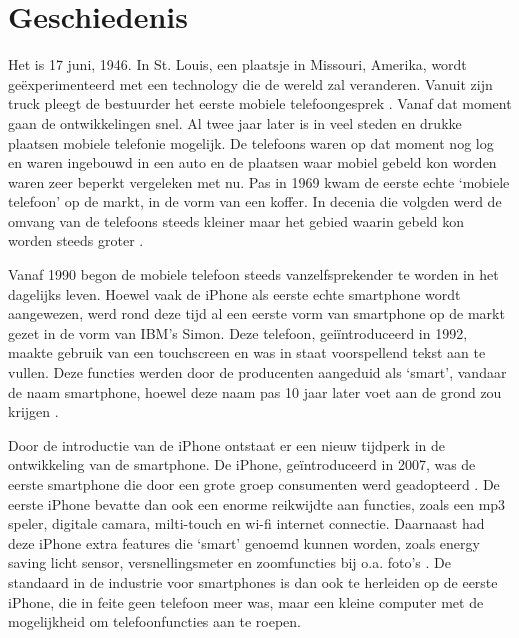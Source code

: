 \chapter{Geschiedenis}

Het is 17 juni, 1946.
In St. Louis, een plaatsje in Missouri, Amerika, wordt ge\"experimenteerd met een technology die de wereld zal veranderen.
Vanuit zijn truck pleegt de bestuurder het eerste mobiele telefoongesprek \citep{ATnT}.
Vanaf dat moment gaan de ontwikkelingen snel.
Al twee jaar later is in veel steden en drukke plaatsen mobiele telefonie mogelijk.
De telefoons waren op dat moment nog log en waren ingebouwd in een auto en de plaatsen waar mobiel gebeld kon worden waren zeer beperkt vergeleken met nu.
Pas in 1969 kwam de eerste echte `mobiele telefoon' op de markt, in de vorm van een koffer.
In decenia die volgden werd de omvang van de telefoons steeds kleiner maar het gebied waarin gebeld kon worden steeds groter \citep{Farley}.

Vanaf 1990 begon de mobiele telefoon steeds vanzelfsprekender te worden in het dagelijks leven.
Hoewel vaak de iPhone als eerste echte smartphone wordt aangewezen, werd rond deze tijd al een eerste vorm van smartphone op de markt gezet in de vorm van IBM's Simon.
Deze telefoon, gei\"introduceerd in 1992, maakte gebruik van een touchscreen en was in staat voorspellend tekst aan te vullen.
Deze functies werden door de producenten aangeduid als `smart', vandaar de naam smartphone, hoewel deze naam pas 10 jaar later voet aan de grond zou krijgen \citep{BusinessWeek}.

Door de introductie van de iPhone ontstaat er een nieuw tijdperk in de ontwikkeling van de smartphone.
De iPhone, ge\"introduceerd in 2007, was de eerste smartphone die door een grote groep consumenten werd geadopteerd \citep{Hall}.
De eerste iPhone bevatte dan ook een enorme reikwijdte aan functies, zoals een mp3 speler, digitale camara, milti-touch en wi-fi internet connectie.
Daarnaast had deze iPhone extra features die `smart' genoemd kunnen worden, zoals energy saving licht sensor, versnellingsmeter en zoomfuncties bij o.a. foto's \citep{MacWorld}.
De standaard in de industrie voor smartphones is dan ook te herleiden op de eerste iPhone, die in feite geen telefoon meer was, maar een kleine computer met de mogelijkheid om telefoonfuncties aan te roepen.
